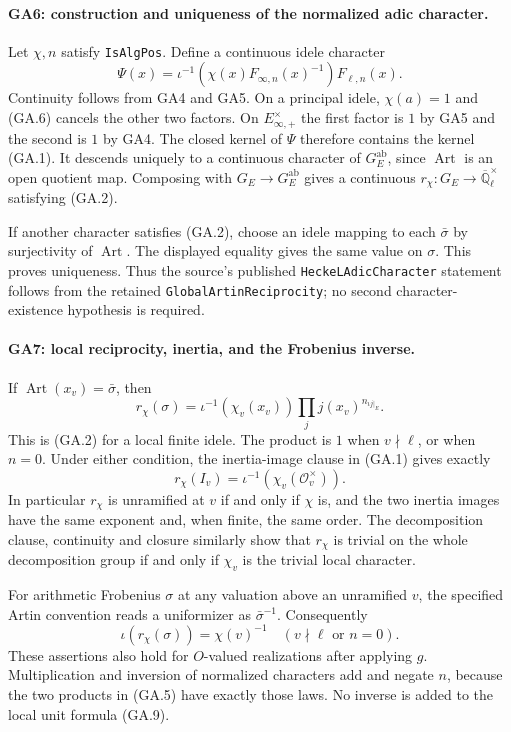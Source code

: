 \paragraph{GA6: construction and uniqueness of the normalized adic character.}
Let $\chi,n$ satisfy \texttt{IsAlgPos}. Define a continuous
idele character
\[
 \Psi(x)=\iota^{-1}\!\left(\chi(x)F_{\infty,n}(x)^{-1}\right)
                          F_{\ell,n}(x).                 \tag{GA.8}
\]
Continuity follows from GA4 and GA5. On a principal idele,
$\chi(a)=1$ and (GA.6) cancels the other two factors.
On $E_{\infty,+}^\times$ the first factor is $1$ by GA5 and
the second is $1$ by GA4. The closed kernel of $\Psi$
therefore contains the kernel (GA.1). It descends uniquely to
a continuous character of $G_E^{\mathrm{ab}}$, since
$\operatorname{Art}$ is an open quotient map. Composing with
$G_E\to G_E^{\mathrm{ab}}$ gives a continuous
$r_\chi:G_E\to\overline{\mathbb Q}_\ell^\times$ satisfying
(GA.2).

If another character satisfies (GA.2), choose an idele mapping
to each $\bar\sigma$ by surjectivity of $\operatorname{Art}$.
The displayed equality gives the same value on $\sigma$.
This proves uniqueness. Thus the source's published
\texttt{HeckeLAdicCharacter} statement follows from the retained
\texttt{GlobalArtinReciprocity}; no second character-existence
hypothesis is required.

\paragraph{GA7: local reciprocity, inertia, and the Frobenius inverse.}
If $\operatorname{Art}(x_v)=\bar\sigma$, then
\[
 r_\chi(\sigma)=\iota^{-1}(\chi_v(x_v))
       \prod_jj(x_v)^{n_{\iota j|_E}}.                    \tag{GA.9}
\]
This is (GA.2) for a local finite idele. The product is $1$
when $v\nmid\ell$, or when $n=0$. Under either condition,
the inertia-image clause in (GA.1) gives exactly
\[
 r_\chi(I_v)=\iota^{-1}(\chi_v(\mathcal O_v^\times)).
                                                                  \tag{GA.10}
\]
In particular $r_\chi$ is unramified at $v$ if and only if
$\chi$ is, and the two inertia images have the same exponent
and, when finite, the same order. The decomposition clause,
continuity and closure similarly show that $r_\chi$ is
trivial on the whole decomposition group if and only if
$\chi_v$ is the trivial local character.

For arithmetic Frobenius $\sigma$ at any valuation above an
unramified $v$, the specified Artin convention reads a
uniformizer as $\bar\sigma^{-1}$. Consequently
\[
 \iota(r_\chi(\sigma))=\chi(v)^{-1}
       \quad(v\nmid\ell\text{ or }n=0).                 \tag{GA.11}
\]
These assertions also hold for $O$-valued realizations after
applying $g$. Multiplication and inversion of normalized
characters add and negate $n$, because the two products in
(GA.5) have exactly those laws. No inverse is added to the
local unit formula (GA.9).


